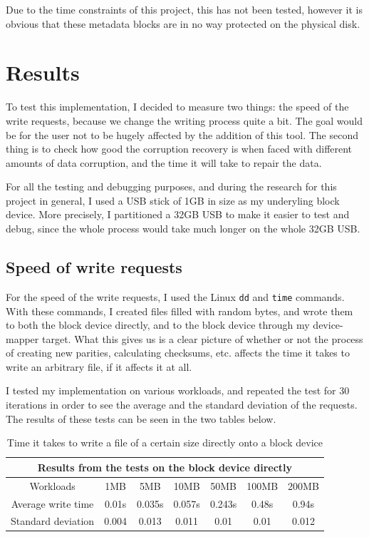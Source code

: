 \documentclass[a4paper,11pt,oneside]{report}
\begin{document}
Due to the time constraints of this project, this has not been tested, however it is obvious that these metadata blocks are in no way protected on the physical disk. 

\chapter{Results}
To test this implementation, I decided to measure two things: the speed of the write requests, because we change the writing process quite a bit. The goal would be for the user not to be hugely affected by the addition of this tool. The second thing is to check how good the corruption recovery is when faced with different amounts of data corruption, and the time it will take to repair the data. 

For all the testing and debugging purposes, and during the research for this project in general, I used a USB stick of 1GB in size as my underyling block device. More precisely, I partitioned a 32GB USB to make it easier to test and debug, since the whole process would take much longer on the whole 32GB USB. 

\section{Speed of write requests}
For the speed of the write requests, I used the Linux \texttt{dd} \cite{dd_man} and \texttt{time} \cite{time_man} commands. With these commands, I created files filled with random bytes, and wrote them to both the block device directly, and to the block device through my device-mapper target. What this gives us is a clear picture of whether or not the process of creating new parities, calculating checksums, etc. affects the time it takes to write an arbitrary file, if it affects it at all.

I tested my implementation on various workloads, and repeated the test for 30 iterations in order to see the average and the standard deviation of the requests. The results of these tests can be seen in the two tables below. 

\begin{table}[!h]
    \centering
    \begin{tabular}{|c|c|c|c|c|c|c|}
    \hline
       \multicolumn{7}{|c|}{Results from the tests on the block device directly} \\
       \hline
       Workloads  & 1MB & 5MB & 10MB & 50MB & 100MB & 200MB \\
       \hline
       Average write time  & 0.01s & 0.035s & 0.057s & 0.243s & 0.48s & 0.94s \\
       \hline
       Standard deviation  & 0.004 & 0.013 & 0.011 & 0.01 & 0.01 & 0.012 \\
    \hline
    \end{tabular}
    \caption{Time it takes to write a file of a certain size directly onto a block device}
    \label{tab:block_device}
\end{table}
\end{document}
